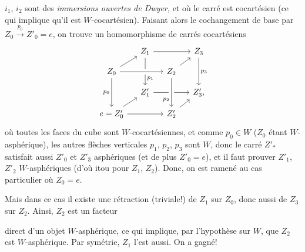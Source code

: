 $i_1$, $i_2$ sont des \textit{immersions ouvertes de Dwyer,} et où le carré est cocartésien (ce qui implique qu'il est $W$-cocartésien). Faisant alors le cochangement de base par $Z_0 \xrightarrow{p_0} Z'_0 = e$, on trouve un homomorphisme de carrés cocartésiens
\[
\begin{tikzcd}[ampersand replacement=\&, column sep=small, row sep=small]
 \& Z_1 \arrow[rr] \arrow[dd, "p_1" near end] \& \& Z_3 \arrow[dd, "p_3"] \\
Z_0 \arrow[ur] \arrow[rr, crossing over] \arrow[dd, "p_0"'] \& \& Z_2 \arrow[ur] \& \\
 \& Z'_1 \arrow[rr] \& \& Z'_3, \\
e = Z'_0 \arrow[ur] \arrow[rr] \& \& Z'_2 \arrow[ur] \arrow[from=uu, crossing over, "p_2"' near end] \&
\end{tikzcd}
\]
où toutes les faces du cube sont $W$-cocartésiennes, et comme $p_0 \in W$ ($Z_0$ étant $W$-asphérique), les autres flèches verticales $p_1$, $p_2$, $p_3$ sont $W$, donc le carré $Z'_*$ satisfait aussi $Z'_0$ et $Z'_3$ asphériques (et de plus $Z'_0 = e$), et il faut prouver $Z'_1$, $Z'_2$ $W$-asphériques (d'où itou pour $Z_1$, $Z_2$). Donc, on est ramené au cas particulier où $Z_0 = e$.

Mais dans ce cas il existe une rétraction (triviale!) de $Z_1$ sur $Z_0$, donc aussi de $Z_3$ sur $Z_2$. Ainsi, $Z_2$ est un facteur


direct d'un objet $W$-asphérique, ce qui implique, par l'hypothèse sur $W$, que $Z_2$ est $W$-asphérique. Par symétrie, $Z_1$ l'est aussi. On a gagné!

